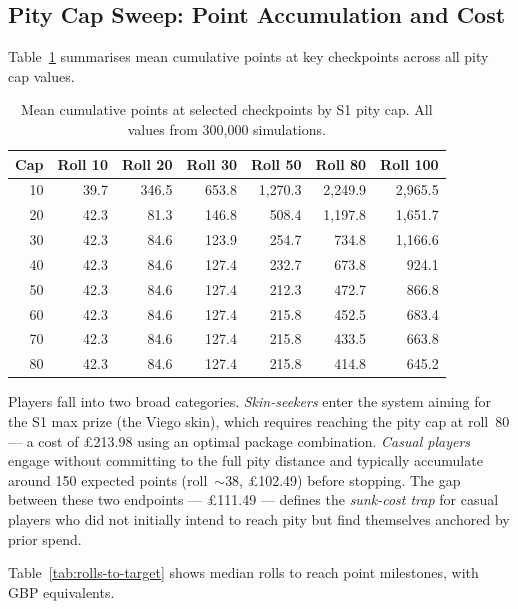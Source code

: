 \documentclass[11pt, a4paper]{article}
\begin{document}
\subsection{Pity Cap Sweep: Point Accumulation and Cost}
\label{sec:results-sweep}

Table~\ref{tab:checkpoints} summarises mean cumulative points at key
checkpoints across all pity cap values.

\begin{table}[H]
\centering
\caption{Mean cumulative points at selected checkpoints by S1 pity
cap. All values from 300{,}000 simulations.}
\label{tab:checkpoints}
\begin{tabular}{r r r r r r r}
\toprule
Cap & Roll 10 & Roll 20 & Roll 30 & Roll 50 & Roll 80 & Roll 100 \\
\midrule
10 & 39.7  & 346.5 & 653.8  & 1{,}270.3 & 2{,}249.9 & 2{,}965.5 \\
20 & 42.3  & 81.3  & 146.8  & 508.4     & 1{,}197.8 & 1{,}651.7 \\
30 & 42.3  & 84.6  & 123.9  & 254.7     & 734.8     & 1{,}166.6 \\
40 & 42.3  & 84.6  & 127.4  & 232.7     & 673.8     & 924.1     \\
50 & 42.3  & 84.6  & 127.4  & 212.3     & 472.7     & 866.8     \\
60 & 42.3  & 84.6  & 127.4  & 215.8     & 452.5     & 683.4     \\
70 & 42.3  & 84.6  & 127.4  & 215.8     & 433.5     & 663.8     \\
80 & 42.3  & 84.6  & 127.4  & 215.8     & 414.8     & 645.2     \\
\bottomrule
\end{tabular}
\end{table}

\noindent Players fall into two broad categories. \emph{Skin-seekers}
enter the system aiming for the S1 max prize (the Viego skin),
which requires reaching the pity cap at roll~80 --- a cost of
\pounds213.98 using an optimal package combination.
\emph{Casual players} engage without committing to the full pity
distance and typically accumulate around 150 expected points
(roll~$\sim$38, \pounds102.49) before stopping. The gap between
these two endpoints --- \pounds111.49 --- defines the
\emph{sunk-cost trap} for casual players who did not initially
intend to reach pity but find themselves anchored by prior spend.

Table~\ref{tab:rolls-to-target} shows median rolls to reach point
milestones, with GBP equivalents.
\end{document}
